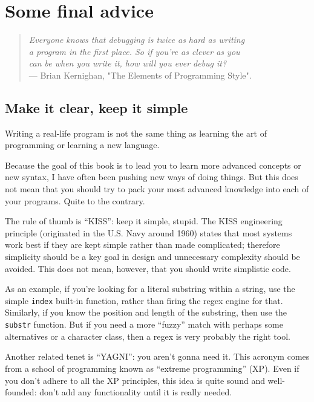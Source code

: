 \chapter{Some final advice}

\begin{quote}
\raggedleft 
\emph{Everyone knows that debugging is twice as hard as writing \\ 
a program in the first place. So if you're as clever as you \\
can be when you write it, how will you ever debug it? }\\
--- Brian Kernighan, "The Elements of Programming Style".
\end{quote}

\section{Make it clear, keep it simple}

Writing a real-life program is not the same thing as learning 
the art of programming or learning a new language.

Because the goal of this book is to lead you to learn 
more advanced concepts or new syntax, I have often been 
pushing new ways of doing things. But this does not mean that 
you should try to pack your most advanced knowledge into 
each of your programs. Quite to the contrary.

The rule of thumb is ``KISS'': keep it simple, stupid. The 
KISS engineering principle (originated in the U.S. Navy 
around 1960) states that most systems work best if they 
are kept simple rather than made complicated; therefore 
simplicity should be a key goal in design and unnecessary 
complexity should be avoided. This does not mean, however, 
that you should write simplistic code.

As an example, if you're looking for a literal substring 
within a string, use the simple {\tt index} built-in function, 
rather than firing the regex engine for that. Similarly, 
if you know the position and length of the substring, then 
use the {\tt substr} function. But if you need a more ``fuzzy'' 
match with perhaps some alternatives or a character class, then 
a regex is very probably the right tool.

Another related tenet is ``YAGNI'': you aren't gonna need 
it. This acronym comes from a school of programming 
known as ``extreme programming'' (XP). Even if you don't 
adhere to all the XP principles, this idea is quite sound 
and well-founded: don't add any functionality until it is 
really needed.

